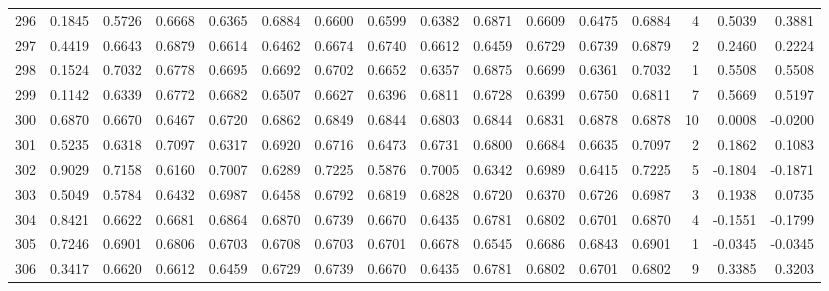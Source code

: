 \begin{tabular}{lrrrrrrrrrrrrrrr}
296 &      0.1845 &  0.5726 &  0.6668 &  0.6365 &  0.6884 &  0.6600 &  0.6599 &  0.6382 &  0.6871 &  0.6609 &   0.6475 &     0.6884 &      4 &                    0.5039 &                     0.3881 \\
297 &      0.4419 &  0.6643 &  0.6879 &  0.6614 &  0.6462 &  0.6674 &  0.6740 &  0.6612 &  0.6459 &  0.6729 &   0.6739 &     0.6879 &      2 &                    0.2460 &                     0.2224 \\
298 &      0.1524 &  0.7032 &  0.6778 &  0.6695 &  0.6692 &  0.6702 &  0.6652 &  0.6357 &  0.6875 &  0.6699 &   0.6361 &     0.7032 &      1 &                    0.5508 &                     0.5508 \\
299 &      0.1142 &  0.6339 &  0.6772 &  0.6682 &  0.6507 &  0.6627 &  0.6396 &  0.6811 &  0.6728 &  0.6399 &   0.6750 &     0.6811 &      7 &                    0.5669 &                     0.5197 \\
300 &      0.6870 &  0.6670 &  0.6467 &  0.6720 &  0.6862 &  0.6849 &  0.6844 &  0.6803 &  0.6844 &  0.6831 &   0.6878 &     0.6878 &     10 &                    0.0008 &                    -0.0200 \\
301 &      0.5235 &  0.6318 &  0.7097 &  0.6317 &  0.6920 &  0.6716 &  0.6473 &  0.6731 &  0.6800 &  0.6684 &   0.6635 &     0.7097 &      2 &                    0.1862 &                     0.1083 \\
302 &      0.9029 &  0.7158 &  0.6160 &  0.7007 &  0.6289 &  0.7225 &  0.5876 &  0.7005 &  0.6342 &  0.6989 &   0.6415 &     0.7225 &      5 &                   -0.1804 &                    -0.1871 \\
303 &      0.5049 &  0.5784 &  0.6432 &  0.6987 &  0.6458 &  0.6792 &  0.6819 &  0.6828 &  0.6720 &  0.6370 &   0.6726 &     0.6987 &      3 &                    0.1938 &                     0.0735 \\
304 &      0.8421 &  0.6622 &  0.6681 &  0.6864 &  0.6870 &  0.6739 &  0.6670 &  0.6435 &  0.6781 &  0.6802 &   0.6701 &     0.6870 &      4 &                   -0.1551 &                    -0.1799 \\
305 &      0.7246 &  0.6901 &  0.6806 &  0.6703 &  0.6708 &  0.6703 &  0.6701 &  0.6678 &  0.6545 &  0.6686 &   0.6843 &     0.6901 &      1 &                   -0.0345 &                    -0.0345 \\
306 &      0.3417 &  0.6620 &  0.6612 &  0.6459 &  0.6729 &  0.6739 &  0.6670 &  0.6435 &  0.6781 &  0.6802 &   0.6701 &     0.6802 &      9 &                    0.3385 &                     0.3203 \\

\end{tabular}
